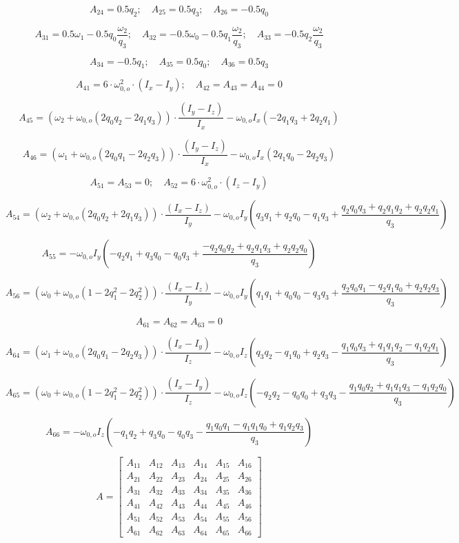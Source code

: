\[
A_{24} = 0.5q_2; \quad A_{25} = 0.5q_3; \quad A_{26} = -0.5q_{0}
\]

\[
A_{31} =  0.5\omega_{1}-0.5q_0 \frac{\omega_2}{q_3}; \quad A_{32} = -0.5\omega_{0}-0.5q_1 \frac{\omega_2}{q_3}; \quad A_{33} = -0.5q_2 \frac{\omega_2}{q_3}
\]

\[
A_{34} = -0.5q_1; \quad A_{35} = 0.5q_0; \quad A_{36} = 0.5q_{3}
\]

\[
A_{41} = 6 \cdot \omega_{0,o}^2 \cdot (I_x - I_y); \quad 
A_{42} = A_{43} = A_{44} = 0
\]

\[
A_{45} = \left( \omega_2 + \omega_{0,o} \left( 2q_0 q_2 - 2q_1 q_3 \right) \right) \cdot \frac{(I_y - I_z)}{I_x} - \omega_{0,o} I_x \left( -2q_1 q_3 + 2q_2 q_1 \right)
\]

\[
A_{46} = \left( \omega_1 + \omega_{0,o} \left( 2q_0 q_1 - 2q_2 q_3 \right) \right) \cdot \frac{(I_y - I_z)}{I_x} - \omega_{0,o} I_x \left( 2q_1 q_0 - 2q_2 q_3 \right)
\]

\[
A_{51} = A_{53} = 0; \quad A_{52} = 6 \cdot \omega_{0,o}^2 \cdot (I_z - I_y)
\]

\[
A_{54} = \left( \omega_2 + \omega_{0,o} \left( 2q_0 q_2 + 2q_1 q_3 \right) \right) \cdot \frac{(I_x - I_z)}{I_y} - \omega_{0,o} I_y \left( q_3 q_1 + q_2 q_0 - q_1 q_3 + \frac{q_2 q_0 q_3 + q_2 q_1 q_2 + q_2 q_2 q_1}{q_3} \right)
\]

\[
A_{55} = -\omega_{0,o} I_y \left( -q_2 q_1 + q_3 q_0 - q_0 q_3 + \frac{-q_2 q_0 q_2 + q_2 q_1 q_3 + q_2 q_2 q_0}{q_3} \right)
\]

\[
A_{56} = \left( \omega_0 + \omega_{0,o} \left( 1 - 2q_1^2 - 2q_2^2 \right) \right) \cdot \frac{(I_x - I_z)}{I_y} - \omega_{0,o} I_y \left( q_1 q_1 + q_0 q_0 - q_3 q_3 + \frac{q_2 q_0 q_1 - q_2 q_1 q_0 + q_2 q_2 q_3}{q_3} \right)
\]

\[
A_{61} = A_{62} = A_{63} = 0
\]

\[
A_{64} = \left( \omega_1 + \omega_{0,o} \left( 2q_0 q_1 - 2q_2 q_3 \right) \right) \cdot \frac{(I_x - I_y)}{I_z} - \omega_{0,o} I_z \left( q_3 q_2 - q_1 q_0 + q_2 q_3 - \frac{q_1 q_0 q_3 + q_1 q_1 q_2 - q_1 q_2 q_1}{q_3} \right)
\]

\[
A_{65} = \left( \omega_0 + \omega_{0,o} \left( 1 - 2q_1^2 - 2q_2^2 \right) \right) \cdot \frac{(I_x - I_y)}{I_z} - \omega_{0,o} I_z \left( -q_2 q_2 - q_0 q_0 + q_3 q_3 - \frac{q_1 q_0 q_2 + q_1 q_1 q_3 - q_1 q_2 q_0}{q_3} \right)
\]

\[
A_{66} = -\omega_{0,o} I_z \left( -q_1 q_2 + q_3 q_0 - q_0 q_3 - \frac{q_1 q_0 q_1 - q_1 q_1 q_0 + q_1 q_2 q_3}{q_3} \right)
\]

\[
A = \begin{bmatrix}
	A_{11} & A_{12} & A_{13} & A_{14} & A_{15} & A_{16} \\
	A_{21} & A_{22} & A_{23} & A_{24} & A_{25} & A_{26} \\
	A_{31} & A_{32} & A_{33} & A_{34} & A_{35} & A_{36} \\
	A_{41} & A_{42} & A_{43} & A_{44} & A_{45} & A_{46} \\
	A_{51} & A_{52} & A_{53} & A_{54} & A_{55} & A_{56} \\
	A_{61} & A_{62} & A_{63} & A_{64} & A_{65} & A_{66}
\end{bmatrix}
\]